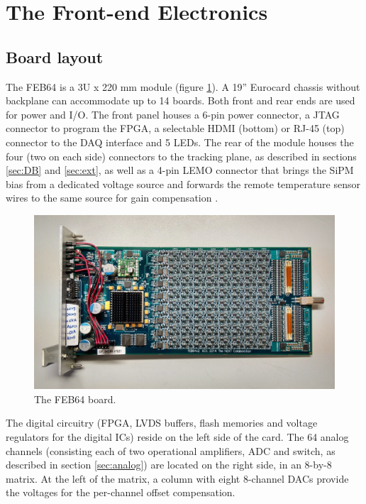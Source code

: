 \section{The Front-end Electronics}
\subsection{Board layout}
The FEB64 \cite{Rodriguez:2015upa} is a 3U x 220 mm module (figure \ref{fig:FEB64}). A 19'' Eurocard chassis without backplane can accommodate up to 14 boards. Both front and rear ends are used for power and I/O. The front panel houses a 6-pin power connector, a JTAG connector to program the FPGA, a selectable HDMI (bottom) or RJ-45 (top) connector to the DAQ interface and 5 LEDs. The rear of the module houses the four (two on each side) connectors to the tracking plane, as described in sections \ref{sec:DB} and \ref{sec:ext}, as well as a 4-pin LEMO connector that brings the SiPM bias from a dedicated voltage source and forwards the remote temperature sensor wires to the same source for gain compensation \cite{Gil:2011cma}.

\begin{figure}[h!]
\centering
\includegraphics[width=.7\textwidth]{IMG/FEB64.JPG}
\caption{The FEB64 board.}
\label{fig:FEB64}
\end{figure}

The digital circuitry (FPGA, LVDS buffers, flash memories and voltage regulators for the digital ICs) reside on the left side of the card. The 64 analog channels (consisting each of two operational amplifiers, ADC and switch, as described in section \ref{sec:analog}) are located on the right side, in an 8-by-8 matrix. At the left of the matrix, a column with eight 8-channel DACs provide the voltages for the per-channel offset compensation.

